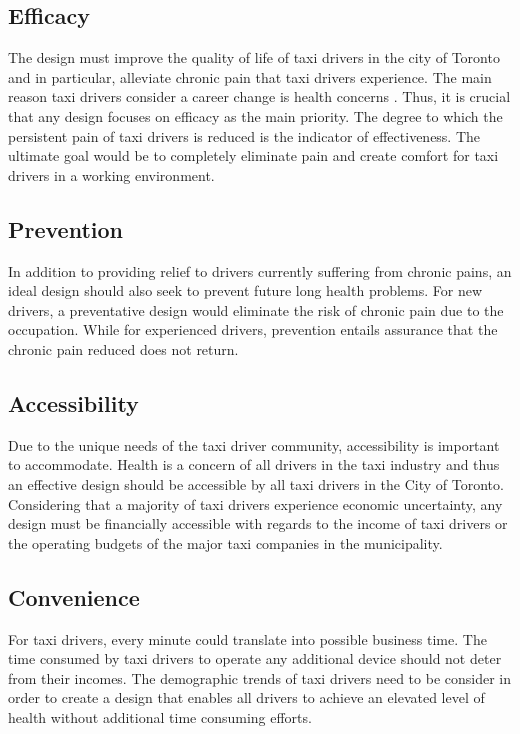 \documentclass[11pt]{article}
\begin{document}
\subsection{Efficacy}
The design must improve the quality of life of taxi 
drivers in the city of Toronto and in particular, alleviate chronic pain 
that taxi drivers experience. The main reason taxi drivers consider a 
career change is health concerns \cite{chicago}. Thus, it is crucial that 
any design focuses on efficacy as the main priority. The degree to which 
the persistent pain of taxi drivers is reduced is the indicator of 
effectiveness. The ultimate goal would be to completely eliminate pain 
and create comfort for taxi drivers in a working environment. 

\subsection{Prevention}
In addition to providing relief to drivers currently suffering from 
chronic pains, an ideal design should also seek to prevent future long 
health problems. For new drivers, a preventative design would eliminate
the risk of chronic pain due to the occupation. While for experienced 
drivers, prevention entails assurance that the chronic pain reduced does
not return. 
 
\subsection{Accessibility}
Due to the unique needs of the taxi driver community, accessibility is 
important to accommodate. Health is a concern of all drivers in the taxi 
industry and thus an effective design should be accessible by all taxi 
drivers in the City of Toronto. Considering that a majority of taxi 
drivers experience economic uncertainty\cite{facey2003health}, any design 
must be
financially accessible with regards to the income of taxi drivers or the operating 
budgets of the major taxi companies in the municipality. 
 
\subsection{Convenience}
For taxi drivers, every minute could translate into possible business 
time\cite{ facey2003health}. The time consumed by taxi drivers to operate 
any additional device should not deter from their incomes. The demographic 
trends of taxi drivers need to be consider in order to create a design 
that enables all drivers to achieve an elevated level of health 
without additional time consuming efforts.
\end{document}
